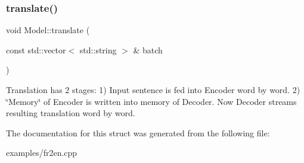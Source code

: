 \subsubsection{\texorpdfstring{translate()}{translate()}}
{\footnotesize\ttfamily void Model\+::translate (\begin{DoxyParamCaption}\item[{const std\+::vector$<$ std\+::string $>$ \&}]{batch }\end{DoxyParamCaption})}

Translation has 2 stages\+: 1) Input sentence is fed into Encoder word by word. 2) \char`\"{}\+Memory\char`\"{} of Encoder is written into memory of Decoder. Now Decoder streams resulting translation word by word. 

The documentation for this struct was generated from the following file\+:\begin{DoxyCompactItemize}
\item 
examples/fr2en.\+cpp\end{DoxyCompactItemize}
